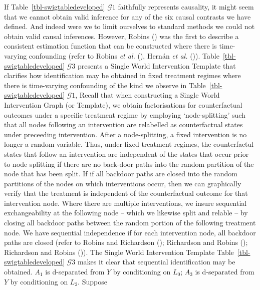 \documentclass[
  single column]{article}
\begin{document}
If Table~\ref{tbl-swigtabledeveloped} \(\mathcal{G}1\) faithfully
represents causality, it might seem that we cannot obtain valid
inference for any of the six causal contrasts we have defined. And
indeed were we to limit ourselves to standard methods we could not
obtain valid causal inferences. However, Robins
() was the first to describe a consistent
estimation function that can be constructed where there is time-varying
confounding (refer to Robins \emph{et al.}
(), Hernán \emph{et al.}
()).
Table~\ref{tbl-swigtabledeveloped} \(\mathcal{G}3\) presents a Single
World Intervention Template that clarifies how identification may be
obtained in fixed treatment regimes where there is time-varying
confounding of the kind we observe in Table~\ref{tbl-swigtabledeveloped}
\(\mathcal{G}1\), Recall that when constructing a Single World
Intervention Graph (or Template), we obtain factorisations for
counterfactual outcomes under a specific treatment regime by employing
`node-splitting' such that all nodes following an intervention are
relabelled as counterfactual states under preceeding intervention. After
a node-splitting, a fixed intervention is no longer a random variable.
Thus, under fixed treatment regimes, the counterfactul states that
follow an intervention are independent of the states that occur prior to
node splitting if there are no back-door paths into the random partition
of the node that has been split. If if all backdoor paths are closed
into the random partitions of the nodes on which interventions occur,
then we can graphically verify that the treatment is independent of the
counterfactual outcome for that intervention node. Where there are
multiple interventions, we insure sequential exchangeability at the
following node -- which we likewise split and relable -- by closing all
backdoor paths between the random portion of the following treatment
node. We have sequential independence if for each intervention node, all
backdoor paths are closed (refer to Robins and Richardson
(); Richardson and Robins
(); Richardson and Robins
()). The Single World
Intervention Template Table~\ref{tbl-swigtabledeveloped}
\(\mathcal{G}3\) makes it clear that sequential identification may be
obtained. \(A_1\) is d-separated from \(Y\) by conditioning on \(L_0\);
\(A_3\) is d-separated from \(Y\) by conditioning on \(L_2\). Suppose
\end{document}
